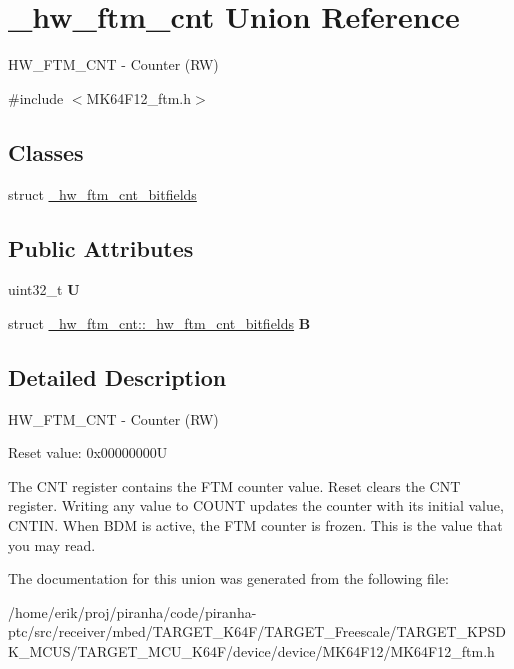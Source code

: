 \hypertarget{union__hw__ftm__cnt}{}\section{\+\_\+hw\+\_\+ftm\+\_\+cnt Union Reference}
\label{union__hw__ftm__cnt}


H\+W\+\_\+\+F\+T\+M\+\_\+\+C\+NT -\/ Counter (RW)  




{\ttfamily \#include $<$M\+K64\+F12\+\_\+ftm.\+h$>$}

\subsection*{Classes}
\begin{DoxyCompactItemize}
\item 
struct \hyperlink{struct__hw__ftm__cnt_1_1__hw__ftm__cnt__bitfields}{\+\_\+hw\+\_\+ftm\+\_\+cnt\+\_\+bitfields}
\end{DoxyCompactItemize}
\subsection*{Public Attributes}
\begin{DoxyCompactItemize}
\item 
uint32\+\_\+t {\bfseries U}\hypertarget{union__hw__ftm__cnt_aa5f6002051ad1c1c73ada4d5ddc50ba2}{}\label{union__hw__ftm__cnt_aa5f6002051ad1c1c73ada4d5ddc50ba2}

\item 
struct \hyperlink{struct__hw__ftm__cnt_1_1__hw__ftm__cnt__bitfields}{\+\_\+hw\+\_\+ftm\+\_\+cnt\+::\+\_\+hw\+\_\+ftm\+\_\+cnt\+\_\+bitfields} {\bfseries B}\hypertarget{union__hw__ftm__cnt_ad4f01cdc8c6eeca21c1859003459e1ef}{}\label{union__hw__ftm__cnt_ad4f01cdc8c6eeca21c1859003459e1ef}

\end{DoxyCompactItemize}


\subsection{Detailed Description}
H\+W\+\_\+\+F\+T\+M\+\_\+\+C\+NT -\/ Counter (RW) 

Reset value\+: 0x00000000U

The C\+NT register contains the F\+TM counter value. Reset clears the C\+NT register. Writing any value to C\+O\+U\+NT updates the counter with its initial value, C\+N\+T\+IN. When B\+DM is active, the F\+TM counter is frozen. This is the value that you may read. 

The documentation for this union was generated from the following file\+:\begin{DoxyCompactItemize}
\item 
/home/erik/proj/piranha/code/piranha-\/ptc/src/receiver/mbed/\+T\+A\+R\+G\+E\+T\+\_\+\+K64\+F/\+T\+A\+R\+G\+E\+T\+\_\+\+Freescale/\+T\+A\+R\+G\+E\+T\+\_\+\+K\+P\+S\+D\+K\+\_\+\+M\+C\+U\+S/\+T\+A\+R\+G\+E\+T\+\_\+\+M\+C\+U\+\_\+\+K64\+F/device/device/\+M\+K64\+F12/M\+K64\+F12\+\_\+ftm.\+h\end{DoxyCompactItemize}
